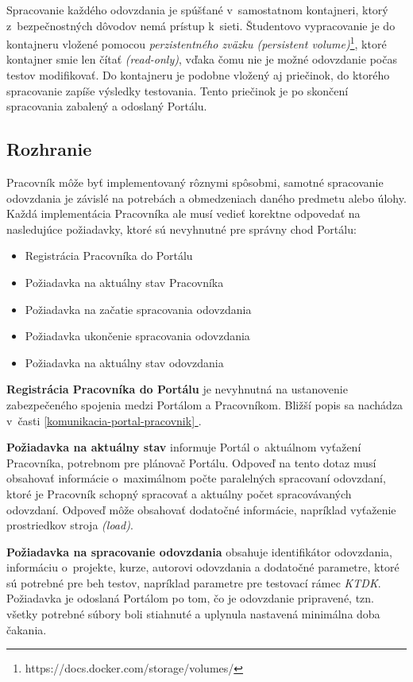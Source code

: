 \documentclass[
  digital, %
  oneside, %
  table,   %
  lof,     %
  lot,   %
]{fithesis3}
\newcommand*{\fullref}[1]{\hyperref[{#1}]{\ref*{#1} \nameref*{#1}}}
\begin{document}
Spracovanie každého odovzdania je spúšťané v~samostatnom kontajneri, ktorý z~bezpečnostných dôvodov nemá prístup k~sieti. Študentovo vypracovanie je do kontajneru vložené pomocou \emph{perzistentného zväzku (persistent volume)}\footnote{https://docs.docker.com/storage/volumes/}, ktoré kontajner smie len čítať \emph{(read-only)}, vďaka čomu nie je možné odovzdanie počas testov modifikovať. Do kontajneru je podobne vložený aj priečinok, do ktorého spracovanie zapíše výsledky testovania. Tento priečinok je po skončení spracovania zabalený a odoslaný Portálu.

\subsection{Rozhranie}

Pracovník môže byť implementovaný rôznymi spôsobmi, samotné spracovanie odovzdania je závislé na potrebách a obmedzeniach daného predmetu alebo úlohy. Každá implementácia Pracovníka ale musí vedieť korektne odpovedať na nasledujúce požiadavky, ktoré sú nevyhnutné pre správny chod Portálu:

\begin{itemize}
    \item Registrácia Pracovníka do Portálu
    \item Požiadavka na aktuálny stav Pracovníka
    \item Požiadavka na začatie spracovania odovzdania
    \item Požiadavka ukončenie spracovania odovzdania
    \item Požiadavka na aktuálny stav odovzdania
\end{itemize}

\textbf{Registrácia Pracovníka do Portálu} je nevyhnutná na ustanovenie zabezpečeného spojenia medzi Portálom a Pracovníkom. Bližší popis sa nachádza v~časti \fullref{komunikacia-portal-pracovnik}.

\textbf{Požiadavka na aktuálny stav} informuje Portál o~aktuálnom vyťažení Pracovníka, potrebnom pre plánovač Portálu. Odpoveď na tento dotaz musí obsahovať informácie o~maximálnom počte paralelných spracovaní odovzdaní, ktoré je Pracovník schopný spracovať a aktuálny počet spracovávaných odovzdaní. Odpoveď môže obsahovať dodatočné informácie, napríklad vyťaženie prostriedkov stroja \emph{(load)}.

\textbf{Požiadavka na spracovanie odovzdania} obsahuje identifikátor odovzdania, informáciu o~projekte, kurze, autorovi odovzdania a dodatočné parametre, ktoré sú potrebné pre beh testov, napríklad parametre pre testovací rámec \emph{KTDK}. Požiadavka je odoslaná Portálom po tom, čo je odovzdanie pripravené, tzn. všetky potrebné súbory boli stiahnuté a uplynula nastavená minimálna doba čakania.
\end{document}
